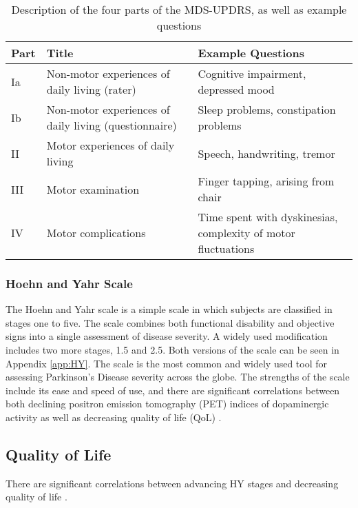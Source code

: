\begin{table}[h]
    \begin{tabularx}{\textwidth}{|l|X|X}
    Part & Title  & Example Questions \\\hline
    Ia   & Non-motor experiences of daily living (rater)  & Cognitive impairment, depressed mood \\
    Ib   & Non-motor experiences of daily living (questionnaire) & Sleep problems, constipation problems \\
    II   & Motor experiences of daily living & Speech, handwriting, tremor    \\
    III  & Motor examination & Finger tapping, arising from chair  \\
    IV   & Motor complications  & Time spent with dyskinesias, \newline complexity of motor fluctuations
    \end{tabularx}
    \caption{Description of the four parts of the MDS-UPDRS, as well as example questions}
    \label{tab:MDS-UPDRS}
\end{table}

\subsubsection{Hoehn and Yahr Scale}
The Hoehn and Yahr scale is a simple scale in which subjects are classified in stages one to five. The scale combines both functional disability and objective signs into a single assessment of disease severity. A widely used modification includes two more stages, 1.5 and 2.5. Both versions of the scale can be seen in Appendix \ref{app:HY}. The scale is the most common and widely used tool for assessing Parkinson's Disease severity across the globe. The strengths of the scale include its ease and speed of use, and there are significant correlations between both declining positron emission tomography (PET) indices of dopaminergic activity as well as decreasing quality of life (QoL) \cite{Goetz2004}.


\subsection{Quality of Life}
There are significant correlations between advancing HY stages and decreasing quality of life \cite{Goetz2004}.

